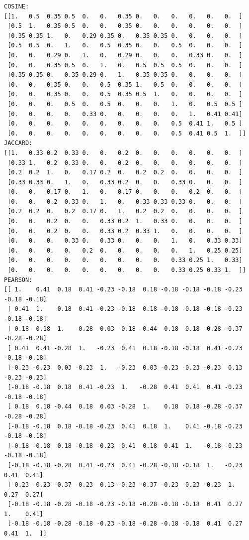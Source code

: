 \documentclass[12pt]{article}
\begin{document}
\begin{Verbatim}[fontsize=\small]
COSINE:
[[1.   0.5  0.35 0.5  0.   0.   0.35 0.   0.   0.   0.   0.   0.  ]
 [0.5  1.   0.35 0.5  0.   0.   0.35 0.   0.   0.   0.   0.   0.  ]
 [0.35 0.35 1.   0.   0.29 0.35 0.   0.35 0.35 0.   0.   0.   0.  ]
 [0.5  0.5  0.   1.   0.   0.5  0.35 0.   0.   0.5  0.   0.   0.  ]
 [0.   0.   0.29 0.   1.   0.   0.29 0.   0.   0.   0.33 0.   0.  ]
 [0.   0.   0.35 0.5  0.   1.   0.   0.5  0.5  0.5  0.   0.   0.  ]
 [0.35 0.35 0.   0.35 0.29 0.   1.   0.35 0.35 0.   0.   0.   0.  ]
 [0.   0.   0.35 0.   0.   0.5  0.35 1.   0.5  0.   0.   0.   0.  ]
 [0.   0.   0.35 0.   0.   0.5  0.35 0.5  1.   0.   0.   0.   0.  ]
 [0.   0.   0.   0.5  0.   0.5  0.   0.   0.   1.   0.   0.5  0.5 ]
 [0.   0.   0.   0.   0.33 0.   0.   0.   0.   0.   1.   0.41 0.41]
 [0.   0.   0.   0.   0.   0.   0.   0.   0.   0.5  0.41 1.   0.5 ]
 [0.   0.   0.   0.   0.   0.   0.   0.   0.   0.5  0.41 0.5  1.  ]]
JACCARD:
[[1.   0.33 0.2  0.33 0.   0.   0.2  0.   0.   0.   0.   0.   0.  ]
 [0.33 1.   0.2  0.33 0.   0.   0.2  0.   0.   0.   0.   0.   0.  ]
 [0.2  0.2  1.   0.   0.17 0.2  0.   0.2  0.2  0.   0.   0.   0.  ]
 [0.33 0.33 0.   1.   0.   0.33 0.2  0.   0.   0.33 0.   0.   0.  ]
 [0.   0.   0.17 0.   1.   0.   0.17 0.   0.   0.   0.2  0.   0.  ]
 [0.   0.   0.2  0.33 0.   1.   0.   0.33 0.33 0.33 0.   0.   0.  ]
 [0.2  0.2  0.   0.2  0.17 0.   1.   0.2  0.2  0.   0.   0.   0.  ]
 [0.   0.   0.2  0.   0.   0.33 0.2  1.   0.33 0.   0.   0.   0.  ]
 [0.   0.   0.2  0.   0.   0.33 0.2  0.33 1.   0.   0.   0.   0.  ]
 [0.   0.   0.   0.33 0.   0.33 0.   0.   0.   1.   0.   0.33 0.33]
 [0.   0.   0.   0.   0.2  0.   0.   0.   0.   0.   1.   0.25 0.25]
 [0.   0.   0.   0.   0.   0.   0.   0.   0.   0.33 0.25 1.   0.33]
 [0.   0.   0.   0.   0.   0.   0.   0.   0.   0.33 0.25 0.33 1.  ]]
PEARSON:
[[ 1.    0.41  0.18  0.41 -0.23 -0.18  0.18 -0.18 -0.18 -0.18 -0.23 -0.18 -0.18]
 [ 0.41  1.    0.18  0.41 -0.23 -0.18  0.18 -0.18 -0.18 -0.18 -0.23 -0.18 -0.18]
 [ 0.18  0.18  1.   -0.28  0.03  0.18 -0.44  0.18  0.18 -0.28 -0.37 -0.28 -0.28]
 [ 0.41  0.41 -0.28  1.   -0.23  0.41  0.18 -0.18 -0.18  0.41 -0.23 -0.18 -0.18]
 [-0.23 -0.23  0.03 -0.23  1.   -0.23  0.03 -0.23 -0.23 -0.23  0.13 -0.23 -0.23]
 [-0.18 -0.18  0.18  0.41 -0.23  1.   -0.28  0.41  0.41  0.41 -0.23 -0.18 -0.18]
 [ 0.18  0.18 -0.44  0.18  0.03 -0.28  1.    0.18  0.18 -0.28 -0.37 -0.28 -0.28]
 [-0.18 -0.18  0.18 -0.18 -0.23  0.41  0.18  1.    0.41 -0.18 -0.23 -0.18 -0.18]
 [-0.18 -0.18  0.18 -0.18 -0.23  0.41  0.18  0.41  1.   -0.18 -0.23 -0.18 -0.18]
 [-0.18 -0.18 -0.28  0.41 -0.23  0.41 -0.28 -0.18 -0.18  1.   -0.23  0.41  0.41]
 [-0.23 -0.23 -0.37 -0.23  0.13 -0.23 -0.37 -0.23 -0.23 -0.23  1.    0.27  0.27]
 [-0.18 -0.18 -0.28 -0.18 -0.23 -0.18 -0.28 -0.18 -0.18  0.41  0.27  1.    0.41]
 [-0.18 -0.18 -0.28 -0.18 -0.23 -0.18 -0.28 -0.18 -0.18  0.41  0.27  0.41  1.  ]]
\end{Verbatim}
\end{document}
